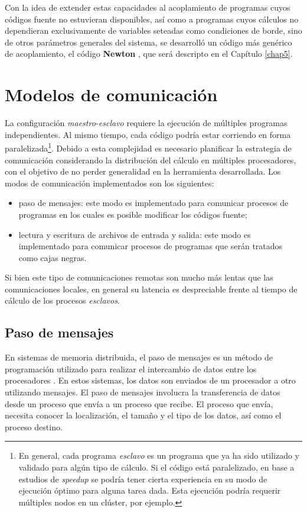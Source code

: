 Con la idea de extender estas capacidades al acoplamiento de programas cuyos códigos fuente no estuvieran disponibles,
así como a programas cuyos cálculos no dependieran exclusivamente de variables seteadas como condiciones de borde,
sino de otros parámetros generales del sistema,
se desarrolló un código más genérico de acoplamiento, el código \textbf{Newton} \cite{newton},
que será descripto en el Capítulo \ref{chap5}.

\section{Modelos de comunicación}
\label{2:comunicacion}

La configuración \textit{maestro-esclavo} requiere la ejecución de múltiples programas independientes.
Al mismo tiempo, cada código podría estar corriendo en forma paralelizada\footnote{
En general, cada programa \textit{esclavo} es un programa que ya ha sido utilizado y validado para algún tipo de cálculo.
Si el código está paralelizado, en base a estudios de \textit{speedup} se podría tener cierta experiencia en su modo de ejecución óptimo para alguna tarea dada.
Esta ejecución podría requerir múltiples nodos en un clúster, por ejemplo.
}.
Debido a esta complejidad es necesario planificar la estrategia de comunicación considerando la distribución del cálculo en múltiples procesadores,
con el objetivo de no perder generalidad en la herramienta desarrollada.
Los modos de comunicación implementados son los siguientes:
\begin{itemize}
\item paso de mensajes: este modo es implementado para comunicar procesos de programas en los cuales es posible modificar los códigos fuente;
\item lectura y escritura de archivos de entrada y salida: este modo es implementado para comunicar procesos de programas que serán tratados como cajas negras.
\end{itemize}

Si bien este tipo de comunicaciones remotas son mucho más lentas que las
comunicaciones locales, en general su latencia es despreciable frente al tiempo de cálculo de los procesos \textit{esclavos}.

\subsection*{Paso de mensajes}
\label{2:mpi}

En sistemas de memoria distribuida, el paso de mensajes es un método de
programación utilizado para realizar el intercambio de datos entre los
procesadores \cite{comunicacion}. En estos sistemas, los datos son enviados de un procesador a otro
utilizando mensajes. El paso de mensajes involucra la transferencia de datos desde un proceso
que envía a un proceso que recibe. El proceso que envía,
necesita conocer la localización, el tamaño y el tipo de los datos, así como el
proceso destino.

